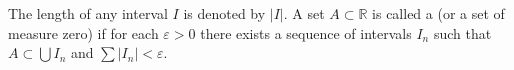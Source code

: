 The length of any interval $I$ is denoted by $|I|$. A set $A \subset \mathbb{R}$ is called a  (or a set of measure zero) if for each $\varepsilon > 0$ there exists a sequence of intervals $I_n$ such that $A \subset \bigcup I_n$ and $\sum |I_n| < \varepsilon$.
